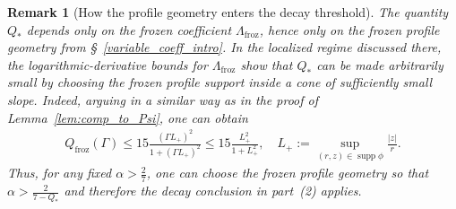 \documentclass[reqno,11pt]{amsart}
\newtheorem{remark}{Remark}[section]
\newcommand{\supp}{\operatorname{supp}}
\begin{document}
\begin{remark}[How the profile geometry enters the decay threshold]
The quantity $Q_*$ depends only on the frozen coefficient
$\Lambda_{\mathrm{froz}}$, hence only on the frozen profile geometry from
\S~\ref{variable_coeff_intro}. In the localized regime discussed there, the
logarithmic-derivative bounds for $\Lambda_{\mathrm{froz}}$ show that $Q_*$ can be made
arbitrarily small by 
choosing the frozen profile support inside a cone of sufficiently small slope.
Indeed, arguing in a similar way as in the proof of Lemma~\ref{lem:comp_to_Psi}, one can obtain
    \begin{align*}
        Q_{\mathrm{froz}}(\Gamma) \leq 15 \frac{(\Gamma L_+)^2}{1+(\Gamma L_+)^2}
        \leq 15 \frac{L^2_+}{1+L^2_+}, 
        \quad L_+:=\sup _{(r,z)\in \supp \phi  } \frac{|z|}{r}.
    \end{align*}
Thus, for any fixed
$\alpha>\frac27$, one can choose the frozen profile geometry so that
$\alpha>\frac{2}{7-Q_*}$ and therefore the decay conclusion in part~(2) applies.
\end{remark}
\end{document}
